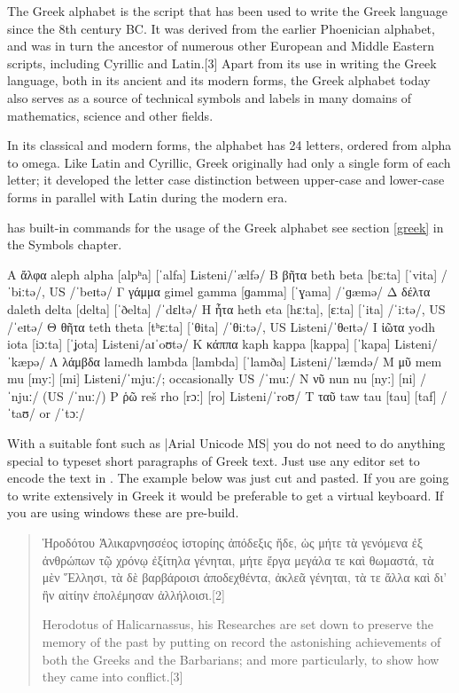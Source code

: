 The Greek alphabet is the script that has been used to write the Greek language since the 8th century BC. It was derived from the earlier Phoenician alphabet, and was in turn the ancestor of numerous other European and Middle Eastern scripts, including Cyrillic and Latin.[3] Apart from its use in writing the Greek language, both in its ancient and its modern forms, the Greek alphabet today also serves as a source of technical symbols and labels in many domains of mathematics, science and other fields.

In its classical and modern forms, the alphabet has 24 letters, ordered from alpha to omega. Like Latin and Cyrillic, Greek originally had only a single form of each letter; it developed the letter case distinction between upper-case and lower-case forms in parallel with Latin during the modern era.

\tex has built-in commands for the usage of the Greek alphabet see section \ref{greek} in the Symbols chapter.

\bgroup
\obeylines
\greek\obeyspaces

Α	ἄλφα	aleph	alpha	[alpʰa]	[ˈalfa]	Listeni/ˈælfə/
Β	βῆτα	beth	beta	[bɛːta]	[ˈvita]	/ˈbiːtə/, US /ˈbeɪtə/
Γ	γάμμα	gimel	gamma	[ɡamma]	[ˈɣama]	/ˈɡæmə/
Δ	δέλτα	daleth	delta	[delta]	[ˈðelta]	/ˈdɛltə/
Η	ἦτα	  heth	   eta	 [hɛːta], [ɛːta]	[ˈita]	/ˈiːtə/, US /ˈeɪtə/
Θ	θῆτα	teth	theta	[tʰɛːta]	[ˈθita]	/ˈθiːtə/, US Listeni/ˈθeɪtə/
Ι	ἰῶτα	yodh	iota	[iɔːta]	[ˈʝota]	Listeni/aɪˈoʊtə/
Κ	κάππα	kaph	kappa	[kappa]	[ˈkapa]	Listeni/ˈkæpə/
Λ	λάμβδα	lamedh	lambda	[lambda]	[ˈlamða]	Listeni/ˈlæmdə/
Μ	μῦ	mem	mu	[myː]	[mi]	Listeni/ˈmjuː/; occasionally US /ˈmuː/
Ν	νῦ	nun	nu	[nyː]	[ni]	/ˈnjuː/ (US /ˈnuː/)
Ρ	ῥῶ	reš	rho	[rɔː]	[ro]	Listeni/ˈroʊ/
Τ	ταῦ	taw	tau	[tau]	[taf]	/ˈtaʊ/ or /ˈtɔː/
\egroup

With a suitable font such as |Arial Unicode MS| you do not need to do anything special to typeset short paragraphs of Greek text. Just use any editor set to encode the text in \utfviii. The example below was just cut and pasted. If you are going to write extensively in Greek it would be preferable to get a virtual keyboard. If you are using windows these are pre-build. 

\topline
\begin{quote}
Ἡροδότου Ἁλικαρνησσέος ἱστορίης ἀπόδεξις ἥδε, ὡς μήτε τὰ γενόμενα ἐξ ἀνθρώπων τῷ χρόνῳ ἐξίτηλα γένηται, μήτε ἔργα μεγάλα τε καὶ θωμαστά, τὰ μὲν Ἕλλησι, τὰ δὲ βαρβάροισι ἀποδεχθέντα, ἀκλεᾶ γένηται, τὰ τε ἄλλα καὶ δι' ἣν αἰτίην ἐπολέμησαν ἀλλήλοισι.[2]

Herodotus of Halicarnassus, his Researches are set down to preserve the memory of the past by putting on record the astonishing achievements of both the Greeks and the Barbarians; and more particularly, to show how they came into conflict.[3]
\end{quote}
\bottomline

